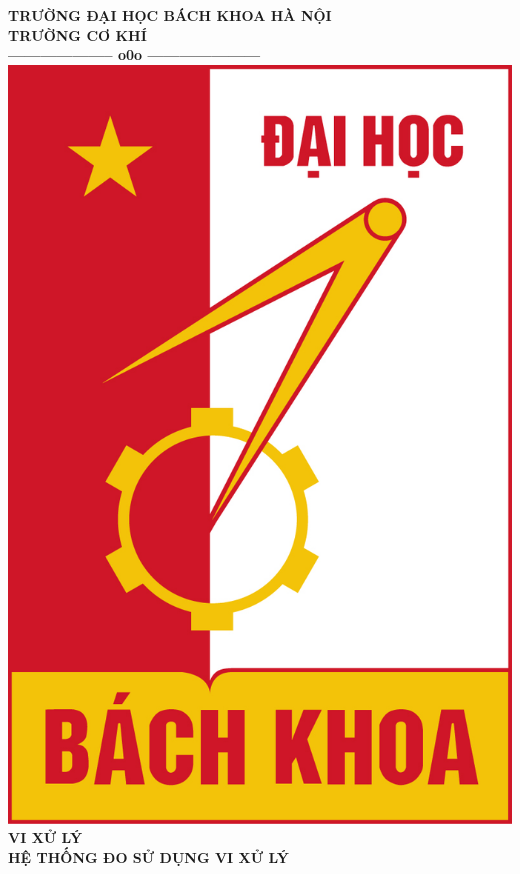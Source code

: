 \documentclass[12pt]{report}
\begin{document}
\thispagestyle{empty}
\thisfancypage{
	\setlength{\fboxsep}{0pt}
	\fbox}{}

\begin{center}
	
	{\fontsize{13pt}{1}\selectfont\textbf{TRƯỜNG ĐẠI HỌC BÁCH KHOA HÀ NỘI}}
	\\
	{\fontsize{13pt}{1}\selectfont\textbf{TRƯỜNG CƠ KHÍ}}
	\\		
	\textbf{--------------------  o0o  ---------------------}\\[1cm]
	\includegraphics[scale=0.5]{image/BVP-logo bk-rgb.jpg} \\[1cm]
\textbf{{\LARGE VI XỬ LÝ}}\\[0.2cm]
\textbf{{\LARGE HỆ THỐNG ĐO SỬ DỤNG VI XỬ LÝ}}
\textbf{}\\[1cm]
\end{center}
\end{document}
